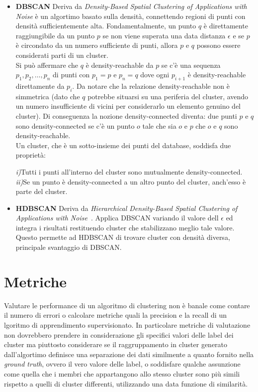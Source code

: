 \begin{itemize}
\item \textbf{DBSCAN}
Deriva da \textit{Density-Based Spatial Clustering of Applications with Noise} è un algortimo basato sulla densità, connettendo regioni di punti con densità sufficientemente alta. Fondamentalmente, un punto $q$  è direttamente raggiungibile da un punto $p$ se non viene superata una data distanza $\epsilon$ e se $p$ è circondato da un numero sufficiente di punti, allora $p$ e $q$ possono essere considerati parti di un cluster. 
\\
Si può affermare che $q$ è density-reachable da $p$ se c'è una sequenza $p_1, p_2,  \ldots, p_n$ di punti con $p_1 = p$ e $p_n = q$ dove ogni $p_{i+1}$ è density-reachable direttamente da $p_i$. Da notare che la relazione density-reachable non è simmetrica (dato che $q$ potrebbe situarsi su una periferia del cluster, avendo un numero insufficiente di vicini per considerarlo un elemento genuino del cluster). Di conseguenza la nozione density-connected diventa: due punti $p$ e $q$ sono density-connected se c'è un punto $o$ tale che sia $o$ e $p$ che $o$ e $q$ sono density-reachable.
\\
Un cluster, che è un sotto-insieme dei punti del database, soddisfa due proprietà:

\textit{i)}Tutti i punti all'interno del cluster sono mutualmente density-connected.
\textit{ii)}Se un punto è density-connected a un altro punto del cluster, anch'esso è parte del cluster.

\item \textbf{HDBSCAN}
Deriva da \textit{Hierarchical Density-Based Spatial Clustering of Applications with Noise}~\cite{Campello15}. Applica DBSCAN variando il valore dell $\epsilon$ ed integra i risultati restituendo cluster che stabilizzano meglio tale valore.
\\
Questo permette ad HDBSCAN di trovare cluster con densità diversa, principale svantaggio di DBSCAN.
\end{itemize}

\section{Metriche}
Valutare le performance di un algoritmo di clustering non è banale come contare il numero di errori o calcolare metriche quali la precision e la recall di un lgoritmo di apprendimento supervisionato. In particolare metriche di valutazione non dovrebbero prendere in considerazione gli specifici valori delle label dei cluster ma piuttosto considerare se il raggruppamento in cluster generato dall'algortimo definisce una separazione dei dati similmente a quanto fornito nella \textit{ground truth}, ovvero il vero valore delle label, o soddisfare qualche assunzione come quella che i membri che appartangono allo stesso cluster sono più simili rispetto a quelli di cluster differenti, utilizzando una data funzione di similarità.

